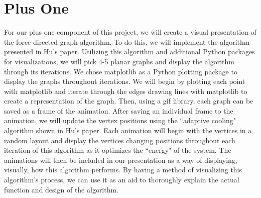 \section{Plus One}
For our plus one component of this project, we will create a visual presentation of the force-directed graph algorithm. 
To do this, we will implement the algorithm presented in Hu's paper. Utilizing this algorithm and additional Python packages for visualizations,
we will pick 4-5 planar graphs and display the algorithm through its iterations. We chose matplotlib as a Python plotting package
to display the graphs throughout iterations. We will begin by plotting each point with matplotlib and iterate through
the edges drawing lines with matplotlib to create a representation of the graph. Then, using a gif library, each graph can be saved as a frame
of the animation. After saving an individual frame to the animation, we will update the vertex positions using the ``adaptive cooling" algorithm shown in Hu's paper. 
Each animation will begin with the vertices in a random layout and display the vertices changing positions throughout each iteration of this algorithm
as it optimizes the ``energy" of the system. The animations will then be included in our presentation as a way of displaying,
visually, how this algorithm performs. By having a method of visualizing this algorithm's process, we can use it as an aid to
thoroughly explain the actual function and design of the algorithm.